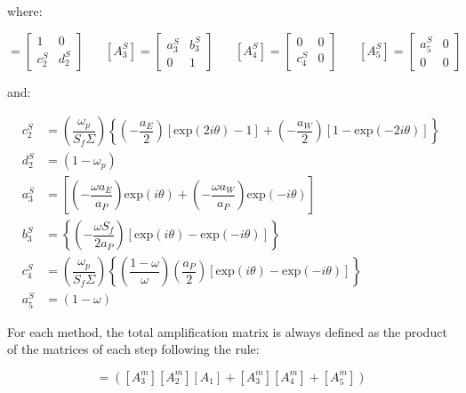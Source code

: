 \documentclass[final,3p,times,10pt,onecolumn]{myElsarticle}
\numberwithin{equation}{section}
\begin{document}
\noindent where:

\begin{equation}
[A^S_2]= 
\begin{bmatrix}
1 & 0 \\
c^S_2 & d^S_2
\end{bmatrix}
\; \; \; \; \; \;
[A^S_3]= 
\begin{bmatrix}
a^S_3 & b^S_3 \\
0 & 1
\end{bmatrix}
\; \; \; \; \; \;
[A^S_4]= 
\begin{bmatrix}
0 & 0 \\
c^S_4 & 0
\end{bmatrix}
\; \; \; \; \; \;
[A^S_5]= 
\begin{bmatrix}
a^S_5 & 0 \\
0 & 0
\end{bmatrix}
\end{equation}

\noindent and:

\begin{equation}
\begin{split}
     c^S_2 &= \left( \dfrac{\omega_p}{S_f \Sigma} \right) 
                    \left\{ \left(-\dfrac{a_E}{2} \right) \left[\text{exp} (2 i \theta) - 1 \right] +
                            \left(-\dfrac{a_W}{2} \right) \left[1 - \text{exp} (-2 i \theta)\right]
                    \right\} \\
     d^S_2 &= (1-\omega_p) \\
     a^S_3 &= \left[\left(-\dfrac{\omega a_E}{a_P}\right) \text{exp} (i \theta) + \left(- \dfrac{\omega a_W}{a_P}\right) \text{exp} (- i \theta)\right] \\
     b^S_3 &= \left\{\left(-\dfrac{\omega S_f}{2 a_P}\right) \left[\text{exp} (i \theta)-\text{exp} (-i \theta)\right] \right\} \\ 
     c^S_4 &= \left( \dfrac{\omega_p}{S_f \Sigma} \right) 
                    \left\{ \left(\dfrac{1-\omega}{\omega} \right) \left(\dfrac{a_P}{2} \right) \left[\text{exp} (i \theta) - \text{exp} (- i \theta) \right] 
                    \right\} \\
     a^S_5 &= (1-\omega)      
\end{split}
\end{equation}

For each method, the total amplification matrix is always defined as the product of the matrices of each step following the rule:

\begin{equation}
[A^m] = ([A^m_3] [A^m_2] [A_1] + [A^m_3] [A^m_4] + [A^m_5])
\end{equation}
\end{document}
